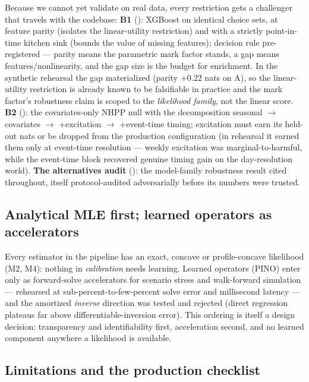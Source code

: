 Because we cannot yet validate on real data, every restriction gets a
challenger that travels with the codebase:
\textbf{B1} (): XGBoost on identical choice sets, at feature parity
(isolates the linear-utility restriction) and with a strictly point-in-time
kitchen sink (bounds the value of missing features); decision rule
pre-registered --- parity means the parametric mark factor stands, a gap means
features/nonlinearity, and the gap size is the budget for enrichment. In the
synthetic rehearsal the gap materialized (parity $+0.22$ nats on A), so the
linear-utility restriction is already known to be falsifiable in practice and
the mark factor's robustness claim is scoped to the \emph{likelihood family},
not the linear score.
\textbf{B2} (): the covariates-only NHPP null with the
decomposition seasonal $\to$ covariates $\to$ +excitation $\to$ +event-time
timing; excitation must earn its held-out nats or be dropped from the
production configuration (in rehearsal it earned them only at event-time
resolution --- weekly excitation was marginal-to-harmful, while the event-time
block recovered genuine timing gain on the day-resolution world).
\textbf{The alternatives audit} (): the model-family robustness
result cited throughout, itself protocol-audited adversarially before its
numbers were trusted.

\subsection{Analytical MLE first; learned operators as accelerators}
\label{sec:design_pino}

Every estimator in the pipeline has an exact, concave or profile-concave
likelihood (M2, M4): nothing in \emph{calibration} needs learning. Learned
operators (PINO) enter only as forward-solve accelerators for scenario stress
and walk-forward simulation --- rehearsed at sub-percent-to-few-percent
solve error and millisecond latency --- and the amortized \emph{inverse}
direction was tested and rejected (direct regression plateaus far above
differentiable-inversion error). This ordering is itself a design decision:
transparency and identifiability first, acceleration second, and no learned
component anywhere a likelihood is available.

\subsection{Limitations and the production checklist}
\label{sec:design_limits}

